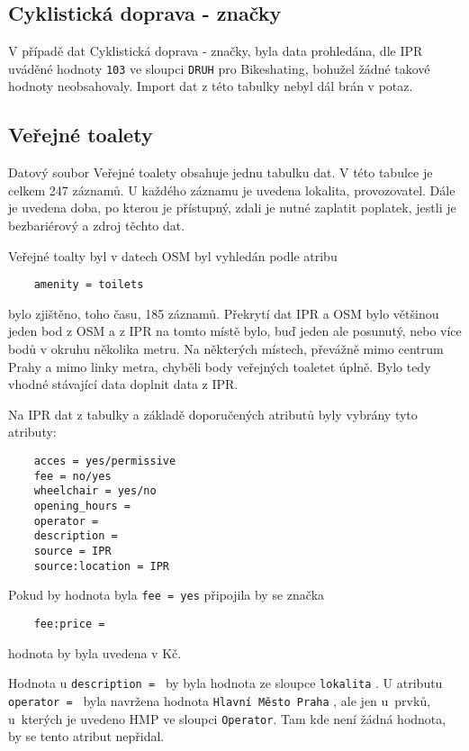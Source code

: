 \subsection{Cyklistická doprava - značky}
\label{Cyklistická doprava - značky}
V případě dat Cyklistická doprava - značky, byla data prohledána, dle IPR
uváděné hodnoty {\tt 103} ve sloupci {\tt DRUH} pro Bikeshating, bohužel žádné
takové hodnoty neobsahovaly. Import dat z této tabulky nebyl dál brán v potaz.


\subsection{Veřejné toalety}
\label{Veřejné toalety}
Datový soubor Veřejné toalety obsahuje jednu tabulku dat. V této tabulce je 
celkem 247 záznamů. U každého záznamu je uvedena lokalita, provozovatel. 
Dále je uvedena doba, po kterou je přístupný, zdali je nutné zaplatit poplatek,
jestli je bezbariérový a zdroj těchto dat.

Veřejné toalty byl v datech OSM byl vyhledán podle atribu
\begin{verbatim}
    amenity = toilets
\end{verbatim}

bylo zjištěno, toho času, 185 záznamů. Překrytí dat IPR a OSM bylo většinou
jeden bod z OSM a z IPR na tomto místě bylo, buď jeden ale posunutý, nebo
více bodů v okruhu několika metru. Na některých místech, převážně mimo centrum
Prahy a mimo linky metra, chyběli body veřejných toaletet úplně.
Bylo tedy vhodné stávající data doplnit data z IPR.

Na IPR dat z tabulky a základě doporučených atributů byly vybrány tyto atributy:
\begin{verbatim}
    acces = yes/permissive
    fee = no/yes
    wheelchair = yes/no
    opening_hours =
    operator =
    description =
    source = IPR
    source:location = IPR
\end{verbatim}
Pokud by hodnota byla {\tt fee~=~yes} připojila by se značka
\begin{verbatim}
    fee:price =
\end{verbatim}
hodnota by byla uvedena v Kč.

Hodnota u {\tt description~= } by byla hodnota ze sloupce {\tt lokalita} .
U atributu {\tt operator~= } byla navržena hodnota {\tt Hlavní Město Praha} ,
ale jen u~prvků, u~kterých je uvedeno HMP ve sloupci {\tt Operator}.
Tam kde není žádná hodnota, by se tento atribut nepřidal.



